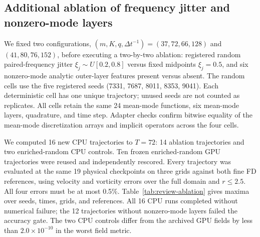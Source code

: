 \subsection{Additional ablation of frequency jitter and nonzero-mode layers}
\label{sec:review-ablation}
We fixed two configurations,
$(m,K,q,\Delta t^{-1})=(37,72,66,128)$ and $(41,80,76,152)$,
before executing a two-by-two ablation: registered random paired-frequency
jitter $\xi_j\sim U[0.2,0.8]$ versus fixed midpoints $\xi_j=0.5$, and six
nonzero-mode analytic outer-layer features present versus absent.
The random cells use the five registered seeds (7331, 7687, 8011, 8353, 9041).
Each deterministic cell has one unique trajectory; unused seeds are not counted
as replicates. All cells retain the same 24 mean-mode functions, six mean-mode
layers, quadrature, and time step. Adapter checks confirm bitwise equality of
the mean-mode discretization arrays and implicit operators across the four cells.

We computed 16 new CPU trajectories to $T=72$: 14 ablation trajectories and
two enriched-random CPU controls. Ten frozen enriched-random GPU trajectories
were reused and independently rescored. Every trajectory was evaluated at the
same 19 physical checkpoints on three grids against both fine FD references,
using velocity and vorticity errors over the full domain and $r\leq2.5$.
All four errors must be at most 0.5\%.
Table~\ref{tab:review-ablation} gives maxima over seeds, times, grids, and references.
All 16 CPU runs completed without numerical failure; the 12 trajectories without
nonzero-mode layers failed the accuracy gate. The two CPU controls differ from
the archived GPU fields by less than $2.0\times10^{-10}$ in the worst field metric.

